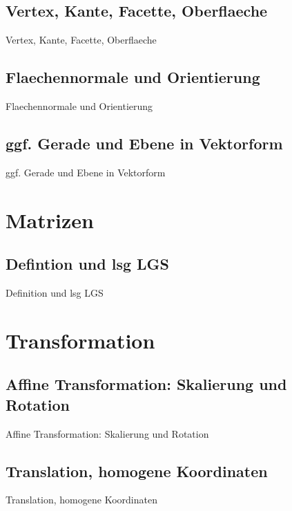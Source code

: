 \documentclass[10pt,aspectratio=169]{beamer}
\begin{document}
  \subsection{Vertex, Kante, Facette, Oberflaeche}
  \begin{frame}{Vertex, Kante, Facette, Oberflaeche}
  \end{frame}

  \subsection{Flaechennormale und Orientierung}
  \begin{frame}{Flaechennormale und Orientierung}
  \end{frame}


  \subsection{ggf. Gerade und Ebene in Vektorform}
  \begin{frame}{ggf. Gerade und Ebene in Vektorform}
  \end{frame}

  \section{Matrizen}

  \subsection{Defintion und lsg LGS}
  \begin{frame}{Definition und lsg LGS}
  \end{frame}

  \section{Transformation}

  \subsection{Affine Transformation: Skalierung und Rotation}
  \begin{frame}{Affine Transformation: Skalierung und Rotation}
  \end{frame}

  \subsection{Translation, homogene Koordinaten}
  \begin{frame}{Translation, homogene Koordinaten}
  \end{frame}
\end{document}
